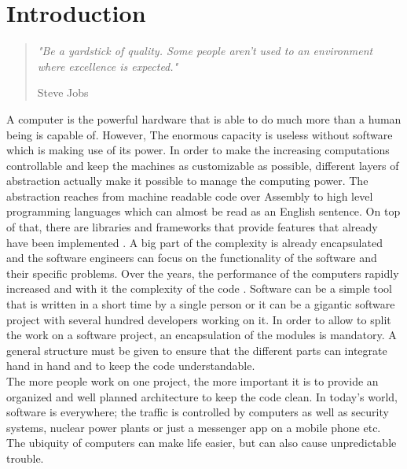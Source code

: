 \chapter{Introduction}

\begin{quote}
\centering 
\em %
"Be a yardstick of quality. Some people aren't used to an environment where excellence is expected."

\medskip
\raggedleft
Steve Jobs
\end{quote}
\vspace{10 mm}

A computer is the powerful hardware that is able to do much more than a human being is capable of. However, The enormous capacity is useless without software which is making use of its power. In order to make the increasing computations controllable and keep the machines as customizable as possible, different layers of abstraction actually make it possible to manage the computing power. The abstraction reaches from machine readable code over Assembly to high level programming languages which can almost be read as an English sentence. On top of that, there are libraries and frameworks that provide features that already have been implemented \cite{Martin:2008:CCH:1388398}. A big part of the complexity is already encapsulated and the software engineers can focus on the functionality of the software and their specific problems.
\bigbreak
Over the years, the performance of the computers rapidly increased and with it the complexity of the code \cite{wirth2008brief}.
Software can be a simple tool that is written in a short time by a single person or it can be a gigantic software project with several hundred developers working on it\cite{cusumano1997microsoft}.
In order to allow to split the work on a software project, an encapsulation of the modules is mandatory. A general structure must be given to ensure that the different parts can integrate hand in hand and to keep the code understandable.\\
The more people work on one project, the more important it is to provide an organized and well planned architecture to keep the code clean.
\bigbreak
In today's world, software is everywhere; the traffic is controlled by computers as well as security systems, nuclear power plants or just a messenger app on a mobile phone etc. \\
The ubiquity of computers can make life easier, but can also cause unpredictable trouble.\\
